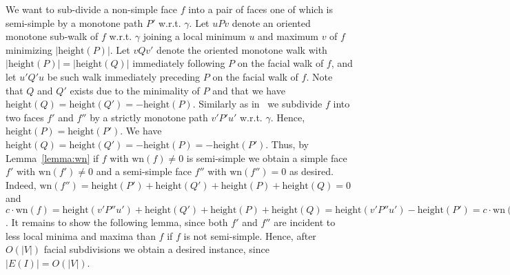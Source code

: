 \documentclass{llncs}
\def\wn{\mathrm{wn}}
\def\length{\mathrm{height}}
\begin{document}
We want to sub-divide a non-simple face $f$  into 
a pair of faces one of which is
semi-simple by a monotone path $P'$ w.r.t. $\gamma$.
Let $uPv$ denote an oriented monotone  sub-walk of $f$ w.r.t. $\gamma$ joining a local minimum $u$ and maximum $v$ of $f$ minimizing  $|\length(P)|$.
Let $vQv'$ denote the oriented  monotone walk with $|\length(P)|=|\length(Q)|$ immediately following $P$ on the facial walk of $f$, and let $u'Q'u$ be such walk  immediately preceding $P$ on the facial walk of $f$. Note that $Q$ and $Q'$ exists due to the minimality of $P$ and that we have
$\length(Q)=\length(Q') = - \length(P)$.
Similarly as in~\cite{F14+} we subdivide $f$ into two faces $f'$ and $f''$
by a strictly monotone path $v'P'u'$  w.r.t. $\gamma$. Hence,  $\length(P) = \length(P')$.
We have $\length(Q)=\length(Q') = - \length(P)= -\length(P')$.
Thus, by Lemma~\ref{lemma:wn} if $f$ with $\wn(f)\not=0$ is semi-simple we obtain a simple face $f'$ with 
$\wn(f')\not=0$ and a semi-simple face $f''$ with $\wn(f'')=0$ as desired.
Indeed, $\wn(f'') = \length(P') +\length(Q') + \length(P)+\length(Q)=0$
and $c\cdot\wn(f) = \length(v'P''u') + \length(Q')+\length(P) + \length(Q) =\length(v'P''u') - \length(P')= c\cdot\wn(f')$. It remains to show the following lemma, since both $f'$ and $f''$ 
are incident to less local minima and maxima than $f$ if $f$ is not semi-simple.
Hence, after $O(|V|)$ facial subdivisions we obtain a desired instance, since $|E(I)|=O(|V|)$.
\end{document}
